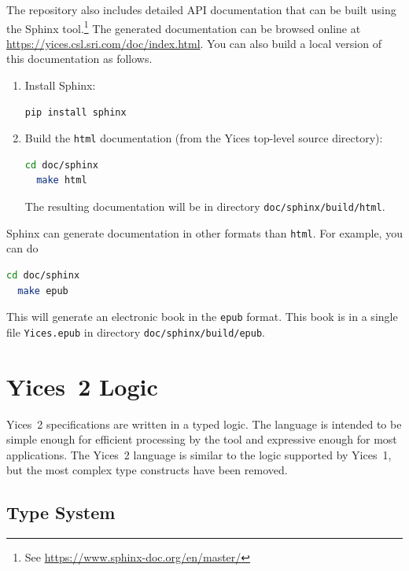 \documentclass[11pt,twoside,fleqn,openright,titlepage]{cslreport}
\begin{document}
\medskip\noindent The repository also includes detailed API
documentation that can be built using the Sphinx tool.\footnote{See
  \url{https://www.sphinx-doc.org/en/master/}} The generated
documentation can be browsed online at
\url{https://yices.csl.sri.com/doc/index.html}. You can also build a local version of
this documentation as follows.
\begin{enumerate}
\item Install Sphinx:
\begin{small}
\begin{lstlisting}[language=sh]
  pip install sphinx
\end{lstlisting}
\end{small}
\item Build the \texttt{html} documentation (from the Yices top-level source directory):
\begin{small}
\begin{lstlisting}[language=sh,deletekeywords={cd}]
  cd doc/sphinx
  make html
\end{lstlisting}
\end{small}
The resulting documentation will be in directory
\texttt{doc/sphinx/build/html}.
\end{enumerate}
Sphinx can generate documentation in
other formats than \texttt{html}. For example, you can do
\begin{small}
\begin{lstlisting}[language=sh,deletekeywords={cd}]
  cd doc/sphinx
  make epub
\end{lstlisting}
\end{small}
This will generate an electronic book in the \texttt{epub} format. This book is in
a single file \texttt{Yices.epub} in directory \texttt{doc/sphinx/build/epub}.


\chapter{Yices~2 Logic}
\label{language}

Yices~2 specifications are  written in a typed logic.  The language is
intended to be simple enough  for efficient processing by the tool and
expressive  enough  for most  applications.  The  Yices~2 language  is
similar to the  logic supported by Yices~1, but  the most complex type
constructs have been removed.


\section{Type System}
\label{type-system}
\end{document}
